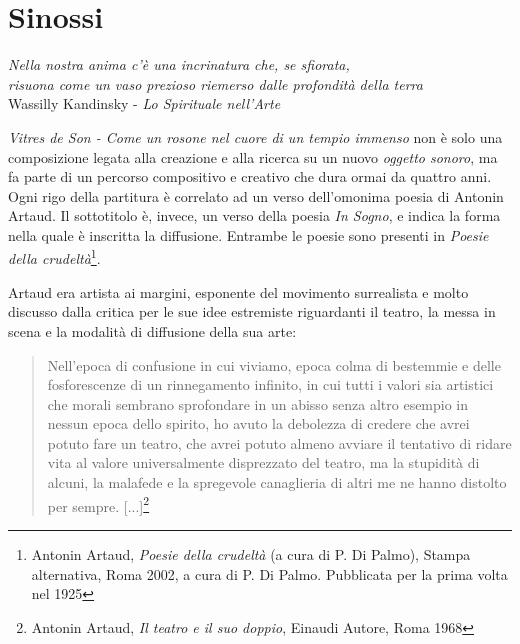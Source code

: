 
\chapter{Sinossi}
\label{chp:Sinossi}

	\begin{flushright}
		\textit{Nella nostra anima c'\`e una incrinatura che, se sfiorata, \\
		risuona come un vaso prezioso riemerso dalle profondit\`a della terra} \\
		Wassilly Kandinsky - \emph{Lo Spirituale nell'Arte}
	\end{flushright}

\textit{Vitres de Son - Come un rosone nel cuore di un tempio immenso} non è solo una composizione legata alla creazione e alla ricerca su un nuovo \textit{oggetto sonoro}, ma fa parte di un percorso compositivo e creativo che dura ormai da quattro anni. Ogni rigo della partitura è correlato ad un verso dell'omonima poesia di Antonin Artaud. Il sottotitolo è, invece, un verso della poesia \textit{In Sogno}, e indica la forma nella quale è inscritta la diffusione. Entrambe le poesie sono presenti in \textit{Poesie della crudeltà}\footnote{Antonin Artaud, \textit{Poesie della crudeltà} (a cura di P. Di Palmo), Stampa alternativa, Roma 2002, a cura di P. Di Palmo. Pubblicata per la prima volta nel 1925}.

Artaud era artista ai margini, esponente del movimento surrealista e molto discusso dalla critica per le sue idee estremiste riguardanti il teatro, la messa in scena  e la modalità di diffusione della sua arte:

\begin{small}
\begin{quotation}
{\sf Nell'epoca di confusione in cui viviamo, epoca colma di bestemmie e delle fosforescenze di un rinnegamento infinito, in cui tutti i valori sia artistici che morali sembrano sprofondare in un abisso senza altro esempio in nessun epoca dello spirito, ho avuto la debolezza di credere che avrei potuto fare un teatro, che avrei potuto almeno avviare il tentativo di ridare vita al valore universalmente disprezzato del teatro, ma la stupidità di alcuni, la malafede e la spregevole canaglieria di altri me ne hanno distolto per sempre. [...]}\footnote{Antonin Artaud, \textit{Il teatro e il suo doppio}, Einaudi Autore, Roma 1968}
\end{quotation}
\end{small}

